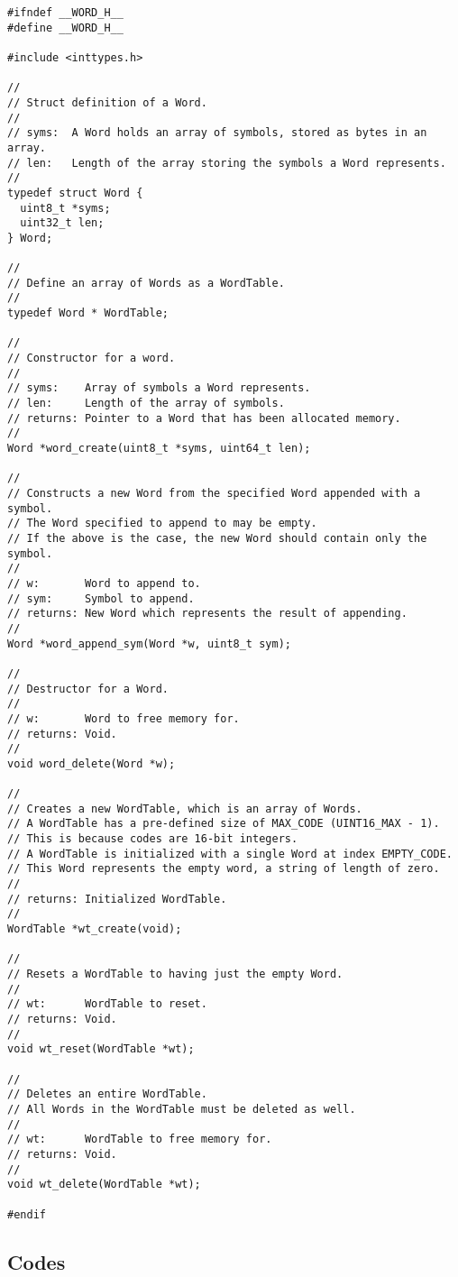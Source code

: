 \documentclass{article}
\begin{document}
\begin{lstlisting}
#ifndef __WORD_H__
#define __WORD_H__

#include <inttypes.h>

//
// Struct definition of a Word.
//
// syms:  A Word holds an array of symbols, stored as bytes in an array.
// len:   Length of the array storing the symbols a Word represents.
//
typedef struct Word {
  uint8_t *syms;
  uint32_t len;
} Word;

//
// Define an array of Words as a WordTable.
//
typedef Word * WordTable;

//
// Constructor for a word.
//
// syms:    Array of symbols a Word represents.
// len:     Length of the array of symbols.
// returns: Pointer to a Word that has been allocated memory.
//
Word *word_create(uint8_t *syms, uint64_t len);

//
// Constructs a new Word from the specified Word appended with a symbol.
// The Word specified to append to may be empty.
// If the above is the case, the new Word should contain only the symbol.
//
// w:       Word to append to.
// sym:     Symbol to append.
// returns: New Word which represents the result of appending.
//
Word *word_append_sym(Word *w, uint8_t sym);

//
// Destructor for a Word.
//
// w:       Word to free memory for.
// returns: Void.
//
void word_delete(Word *w);

//
// Creates a new WordTable, which is an array of Words.
// A WordTable has a pre-defined size of MAX_CODE (UINT16_MAX - 1).
// This is because codes are 16-bit integers.
// A WordTable is initialized with a single Word at index EMPTY_CODE.
// This Word represents the empty word, a string of length of zero.
//
// returns: Initialized WordTable.
//
WordTable *wt_create(void);

//
// Resets a WordTable to having just the empty Word.
//
// wt:      WordTable to reset.
// returns: Void.
//
void wt_reset(WordTable *wt);

//
// Deletes an entire WordTable.
// All Words in the WordTable must be deleted as well.
//
// wt:      WordTable to free memory for.
// returns: Void.
//
void wt_delete(WordTable *wt);

#endif
\end{lstlisting}

\subsection{Codes}
\end{document}
